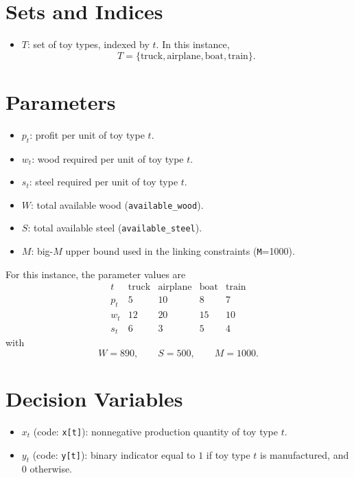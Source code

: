 \section*{Sets and Indices}

\begin{itemize}
    \item $T$: set of toy types, indexed by $t$. In this instance,
    \[
    T=\{\text{truck},\text{airplane},\text{boat},\text{train}\}.
    \]
\end{itemize}

\section*{Parameters}

\begin{itemize}
    \item $p_t$: profit per unit of toy type $t$.
    \item $w_t$: wood required per unit of toy type $t$.
    \item $s_t$: steel required per unit of toy type $t$.
    \item $W$: total available wood (\texttt{available\_wood}).
    \item $S$: total available steel (\texttt{available\_steel}).
    \item $M$: big-$M$ upper bound used in the linking constraints (\texttt{M}=1000).
\end{itemize}

For this instance, the parameter values are
\[
\begin{array}{c|cccc}
t & \text{truck} & \text{airplane} & \text{boat} & \text{train} \\
\hline
p_t & 5 & 10 & 8 & 7 \\
w_t & 12 & 20 & 15 & 10 \\
s_t & 6 & 3 & 5 & 4
\end{array}
\]
with
\[
W=890,\qquad S=500,\qquad M=1000.
\]

\section*{Decision Variables}

\begin{itemize}
    \item $x_t$ (code: \texttt{x[t]}): nonnegative production quantity of toy type $t$.
    \item $y_t$ (code: \texttt{y[t]}): binary indicator equal to $1$ if toy type $t$ is manufactured, and $0$ otherwise.
\end{itemize}

